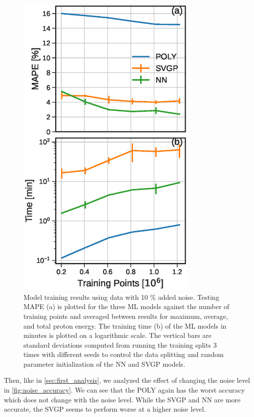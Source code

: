 \begin{figure}
	\centering
	\includegraphics[width=3.5in]{planning/images/paper2/fig4.eps}
	\caption{Model training results using data with 10 \% added noise. Testing MAPE (a) is plotted for the three ML models against the number of training points and averaged between results for maximum, average, and total proton energy. The training time (b) of the ML models in minutes is plotted on a logarithmic scale. The vertical bars are standard deviations computed from running the training splits 3 times with different seeds to control the data splitting and random parameter initialization of the NN and SVGP models.}
	\label{fig:train_time_accuracy}
\end{figure}

Then, like in \autoref{sec:first_analysis}, we analyzed the effect of changing the noise level in \autoref{fig:noise_accuracy}. We can see that the \gls{POLY} again has the worst accuracy which does not change with the noise level. While the \gls{SVGP} and \gls{NN} are more accurate, the \gls{SVGP} seems to perform worse at a higher noise level.

